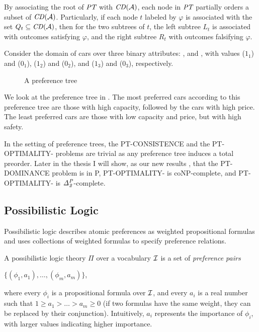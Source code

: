 By associating the root of $\textit{PT}$ with $\mathit{CD}(\mathcal{A})$,
each node in $\textit{PT}$ partially orders a subset of $\mathit{CD}(\mathcal{A})$.
Particularly, if each node $t$ labeled by $\varphi$ 
is associated with the set $Q_t \subseteq \mathit{CD}(\mathcal{A})$,
then for the two subtrees of $t$, the left subtree $L_t$
is associated with outcomes satisfying $\varphi$,
and the right subtree $R_t$ with outcomes falsifying $\varphi$.

Consider the domain of cars over three binary attributes:
,  and ,
with values  ($1_1$) and  ($0_1$),
 ($1_2$) and  ($0_2$), and
 ($1_3$) and  ($0_3$), respectively.

\begin{figure}[!ht]
  \centering
  \caption{A preference tree}
  \label{fig:fpt}
\end{figure}

We look at the preference tree in .
The most preferred cars according to this preference tree
are those with high capacity, followed by the cars with
high price.  The least preferred cars are those with
low capacity and price, but with high safety.

In the setting of preference trees, the PT-CONSISTENCE
and the PT-OPTIMALITY-
problems are trivial as any preference tree induces a
total preorder.
Later in the thesis I will show, as our new results \cite{conf/adt15/liuT}, 
that the PT-DOMINANCE problem is in P, 
PT-OPTIMALITY- is coNP-complete,
and PT-OPTIMALITY- is $\mathit{\Delta^P_{2}}$-complete.


\subsection{Possibilistic Logic}
Possibilistic logic \cite{DuboisLP91} describes atomic preferences as weighted propositional
formulas and uses collections of weighted formulas to specify preference
relations.

A possibilistic logic theory $\Pi$ over a vocabulary $\mathcal{I}$ is a set of 
\emph{preference pairs}
\begin{center}
	$\{ (\phi_1,a_1), \ldots, (\phi_m,a_m) \}$,
\end{center}
where every $\phi_i$ is a propositional formula over $\mathcal{I}$, and every $a_i$ is a real number
such that $1\geq a_1>\ldots>a_m\geq 0$ (if two formulas have the same 
weight, they can be replaced by their conjunction).
Intuitively, $a_i$ represents the importance of $\phi_i$, with larger values
indicating higher importance.

